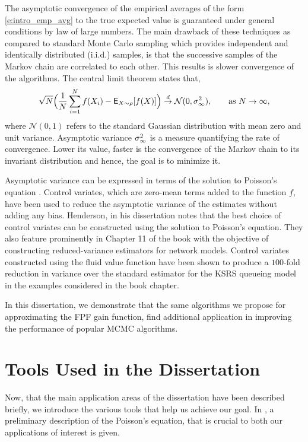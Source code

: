 The asymptotic convergence of the empirical averages of the form \eqref{e:intro_emp_avg} to the true expected value is guaranteed under general conditions by law of large numbers. The main drawback of these techniques as compared to standard Monte Carlo sampling which provides independent and identically distributed (i.i.d.) samples, is that the successive samples of the Markov chain are correlated to each other. This results is slower convergence of the algorithms. The central limit theorem states that,
\begin{equation}
\sqrt{N} \Bigl(\frac{1}{N} \sum_{i=1}^N f(X_i) - {\sf E}_{X \sim \rho} [f(X)] \Bigr) \overset{d}{\to} \mathcal{N}(0, \sigma_\infty^2),\qquad \text{as } N \to \infty, 
\end{equation}
where $\mathcal{N}(0,1)$ refers to the standard Gaussian distribution with mean zero and unit variance. Asymptotic variance $\sigma_\infty^2$ is a measure quantifying the rate of convergence. Lower its value, faster is the convergence of the Markov chain to its invariant distribution and hence, the goal is to minimize it. 

Asymptotic variance can be expressed in terms of the solution to Poisson's equation \cite{ctcn}. Control variates, which are zero-mean terms added to the function $f$, have been used to reduce the asymptotic variance of the estimates without adding any bias. Henderson, in his dissertation \cite{henthesis97} notes that the best choice of control variates can be constructed using the solution to Poisson's equation. They also feature prominently in Chapter 11 of the book \cite{ctcn} with the objective of constructing reduced-variance estimators for network models. Control variates constructed using the fluid value function have been shown to produce a $100$-fold reduction in variance over the standard estimator for the KSRS queueing model in the examples considered in the book chapter. 

In this dissertation, we demonstrate that the same algorithms we propose for approximating the FPF gain function, find additional application in improving the performance of popular MCMC algorithms. 

\section{Tools Used in the Dissertation}
\label{s:tools}
Now, that the main application areas of the dissertation have been described briefly, we introduce the various tools that help us achieve our goal. In , a preliminary description of the Poisson's equation, that is crucial to both our applications of interest is given.
